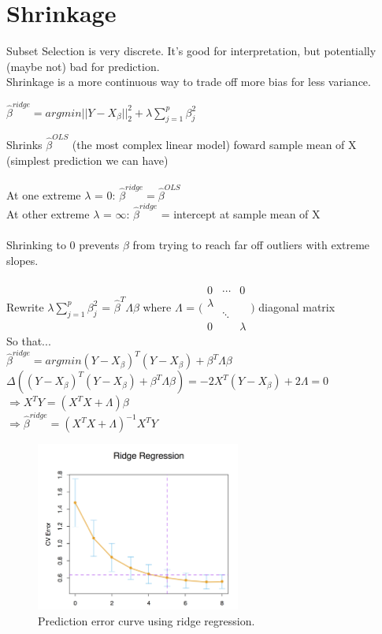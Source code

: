 \documentclass[a4paper]{article}
\begin{document}
\section{Shrinkage}
Subset Selection is very discrete. It's good for interpretation, but potentially (maybe not) bad for prediction.
\\
Shrinkage is a more continuous way to trade off more bias for less variance.
\\
\begin{center}
  $\hat{\beta}^{ridge}= argmin||Y-X_\beta||_2^2+\lambda\sum\limits_{j=1}^{p}\beta_{j}^2$
\end{center}
Shrinks $\hat{\beta}^{OLS}$ (the most complex linear model) foward sample mean of X (simplest prediction we can have)
\\
\\
At one extreme $\lambda$ = 0: $\hat{\beta}^{ridge} = \hat{\beta}^{OLS}$
\\
At other extreme $\lambda$ = $\infty$: $\hat{\beta}^{ridge}$ = intercept at sample mean of X
\\
\\
Shrinking to 0 prevents $\beta$ from trying to reach far off outliers with extreme slopes.
\\
\\
Rewrite $\lambda\sum\limits_{j=1}^{p}\beta_{j}^2$ = $\hat{\beta}^{T}\Lambda\beta$
where $\Lambda$ = $\bigl( \begin{matrix} 0 & \cdots & 0 \\ \lambda \\ & \ddots \\0 &&\lambda\end{matrix} \bigr)$ diagonal matrix	%
\\
So that... \\$\hat{\beta}^{ridge}= argmin(Y-X_{\beta})^T(Y-X_{\beta})+\beta^T\Lambda\beta$
\\
$\Delta((Y-X_{\beta})^T(Y-X_{\beta})+\beta^T\Lambda\beta) = -2X^T(Y-X_{\beta})+2\Lambda = 0$ %
\\$\Rightarrow X^TY = (X^TX+\Lambda)\beta$
\\$\Rightarrow \hat{\beta}^{ridge} = (X^TX+\Lambda)^{-1}X^TY$

\begin{figure}[H] 
\centering
\includegraphics[width=0.6\textwidth]{ridge_regression.png}
\caption{Prediction error curve using ridge regression.}
\end{figure}
\end{document}
